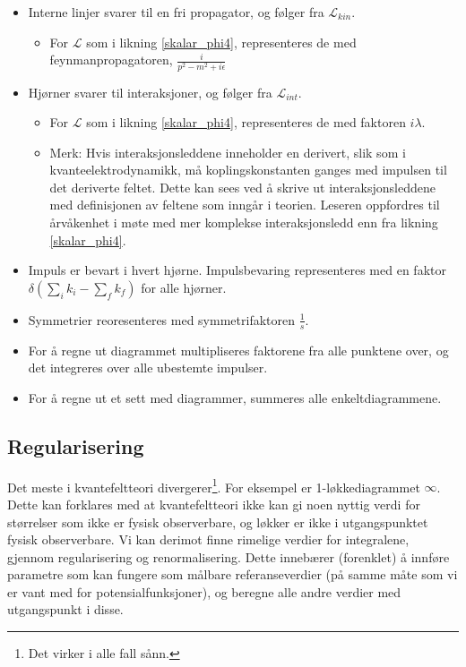 \documentclass{article}
\renewcommand{\L}{\mathcal{L}}
\begin{document}
\begin{itemize}
    \item Interne linjer svarer til en fri propagator, og følger fra $\L_{kin}$. 
    \begin{itemize}
        \item For $\L$ som i likning \eqref{skalar_phi4}, representeres de med feynmanpropagatoren, $\frac{i}{p^2 - m^2 + i\epsilon}$
    \end{itemize}
    \item Hjørner svarer til interaksjoner, og følger fra $\L_{int}$. 
    \begin{itemize}
        \item For $\L$ som i likning \eqref{skalar_phi4}, representeres de med faktoren $i \lambda$.
        \item Merk: Hvis interaksjonsleddene inneholder en derivert, slik som i kvanteelektrodynamikk, må koplingskonstanten ganges med impulsen til det deriverte feltet. 
        Dette kan sees ved å skrive ut interaksjonsleddene med definisjonen av feltene som inngår i teorien.
        Leseren oppfordres til årvåkenhet i møte med mer komplekse interaksjonsledd enn fra likning \eqref{skalar_phi4}.
    \end{itemize}
    \item Impuls er bevart i hvert hjørne. Impulsbevaring representeres med en faktor $\delta(\sum_i k_i - \sum_f k_f)$ for alle hjørner.    
    \item Symmetrier reoresenteres med symmetrifaktoren $\frac{1}{s}$.
    \item For å regne ut diagrammet multipliseres faktorene fra alle punktene over, og det integreres over alle ubestemte impulser.
    \item For å regne ut et sett med diagrammer, summeres alle enkeltdiagrammene.
\end{itemize}

\subsection{Regularisering}
Det meste i kvantefeltteori divergerer\footnote{Det virker i alle fall sånn.}.
For eksempel er 1-løkkediagrammet $\infty$.
Dette kan forklares med at kvantefeltteori ikke kan gi noen nyttig verdi for størrelser som ikke er fysisk observerbare, og løkker er ikke i utgangspunktet fysisk observerbare.
Vi kan derimot finne rimelige verdier for integralene, gjennom regularisering og renormalisering.
Dette innebærer (forenklet) å innføre parametre som kan fungere som målbare referanseverdier (på samme måte som vi er vant med for potensialfunksjoner), og beregne alle andre verdier med utgangspunkt i disse.
\end{document}
